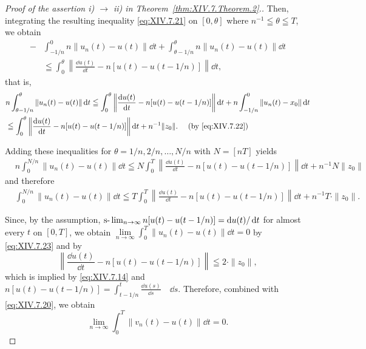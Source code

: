 \begin{proof}[Proof of the assertion i) $\to$ ii) in Theorem~\ref{thm:XIV.7.Theorem.2}.]
Then, integrating the resulting inequality \eqref{eq:XIV.7.21} on $[0, \theta]$ where $n^{-1} \leqq \theta \leqq T$, we obtain 
\[
\begin{aligned}
-& \int_{-1/n} ^{0} n \| u _{n} (t) - u (t) \| \dd t + \int_{\theta -1 / n} ^{\theta} n \| u _{n} (t) - u (t) \| \dd t
\\
&\leqq \int_{0} ^{\theta} \left\| \frac {\dd u (t)}{\dd t} - n [ u (t) - u (t - 1 / n) ] \right\| \dd t,
\end{aligned}
\]
that is, 
\begin{equation*}
\begin{aligned}
&n \int_{\theta -1 / n} ^{\theta} \| u _{n} (t) - u (t) \| \dd t  \leqq \int_{0} ^{\theta} \left\| \frac {\dd u (t)}{\dd t} - n [ u (t) - u (t - 1 / n) ] \right\| \dd t + n \int_{-1/n} ^{0} \| u _{n} (t) - x _{0} \| \dd t \\
&\leqq \int_{0} ^{\theta} \left\| \frac {\dd u (t)}{\dd t} - n [ u (t) - u (t - 1 / n) ] \right\| \dd t + n ^{-1} \| z _{0} \| . \quad \text{ (by \eqref{eq:XIV.7.22}) }
\end{aligned}
\end{equation*}

Adding these inequalities for $\theta = 1 / n, 2 / n, \ldots, N / n$ with $N = [nT]$ yields 
\[
\begin{aligned}
&n \int_{0} ^{N/n} \| u _{n} (t) - u (t) \| \dd t  \leqq N \int_{0} ^{T} \left\| \frac {\dd u (t)}{\dd t} - n [ u (t) - u (t - 1 / n) ] \right\| \dd t + n ^{-1} N \| z _{0} \|
\end{aligned}
\]
and therefore 
\begin{equation}\label{eq:XIV.7.23}
\begin{aligned}
&\int_{0} ^{N/n} \| u _{n} (t) - u (t) \| \dd t  \leqq T \int_{0} ^{T} \left\| \frac {\dd u (t)}{\dd t} - n [ u (t) - u (t - 1 / n) ] \right\| \dd t + n ^{-1} T \cdot \| z _{0} \| .
\end{aligned}
\end{equation}

Since, by the assumption, $\text{s-}\lim\nolimits_{n\to \infty}n[u(t) - u(t - 1 / n)] = \mathop{}\!\mathrm{d} u(t) / \mathop{}\!\mathrm{d} t$ for almost every $t$ on $[0,T]$, we obtain $\lim\limits_{n\to \infty}\int_0^T \|u_n(t) - u(t)\|\dd t = 0$ by \eqref{eq:XIV.7.23} 
and by 
\[
\left\| \frac {\dd u (t)}{\dd t} - n [ u (t) - u (t - 1 / n) ] \right\| \leqq 2 \cdot \| z _{0} \| ,
\]
which is implied by \eqref{eq:XIV.7.14} and $n[u(t) - u(t - 1/n)] = \int_{t-1/n}^{t}\frac{\dd u(s)}{\dd s} \quad \dd s$. Therefore, combined with \eqref{eq:XIV.7.20}, we obtain 
\begin{equation}\label{eq:XIV.7.24}
\lim\limits _{n \rightarrow \infty} \int_{0} ^{T} \| v _{n} (t) - u (t) \| \dd t = 0.
\end{equation}


\end{proof}
